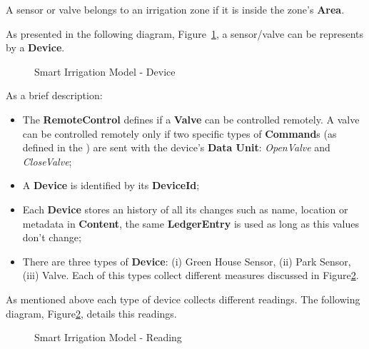 A sensor or valve belongs to an irrigation zone if it is inside the zone's \textbf{Area}.

As presented in the following diagram, Figure~\ref{fig:design:domain:bounded_contexts:irrigation:diagram:device}, a sensor/valve can be represents by a \textbf{Device}.

\begin{figure}[H]
   \centering
  \resizebox{\columnwidth}{!}
  {
     
  }
  \caption[Smart Irrigation Model - Device]{Smart Irrigation Model - Device}
  \label{fig:design:domain:bounded_contexts:irrigation:diagram:device}
\end{figure}

As a brief description:

\begin{itemize}
   \item The \textbf{RemoteControl} defines if a \textbf{Valve} can be controlled remotely. A valve can be controlled remotely only if two specific types of \textbf{Command}s (as defined in the ) are sent with the device's \textbf{Data Unit}: \textit{OpenValve} and \textit{CloseValve};
   \item A \textbf{Device} is identified by its \textbf{DeviceId};
   \item Each \textbf{Device} stores an history of all its changes such as name, location or metadata in \textbf{Content}, the same \textbf{LedgerEntry} is used as long as this values don't change;
   \item There are three types of \textbf{Device}: (i) Green House Sensor, (ii) Park Sensor, (iii) Valve. Each of this types collect different measures discussed in Figure\ref{fig:design:domain:bounded_contexts:irrigation:diagram:reading}.
\end{itemize}

As mentioned above each type of device collects different readings. The following diagram, Figure\ref{fig:design:domain:bounded_contexts:irrigation:diagram:reading}, details this readings.

\begin{figure}[H]
   \centering
  \resizebox{\columnwidth}{!}
  {
     
  }
  \caption[Smart Irrigation Model - Reading]{Smart Irrigation Model - Reading}
  \label{fig:design:domain:bounded_contexts:irrigation:diagram:reading}
\end{figure}

